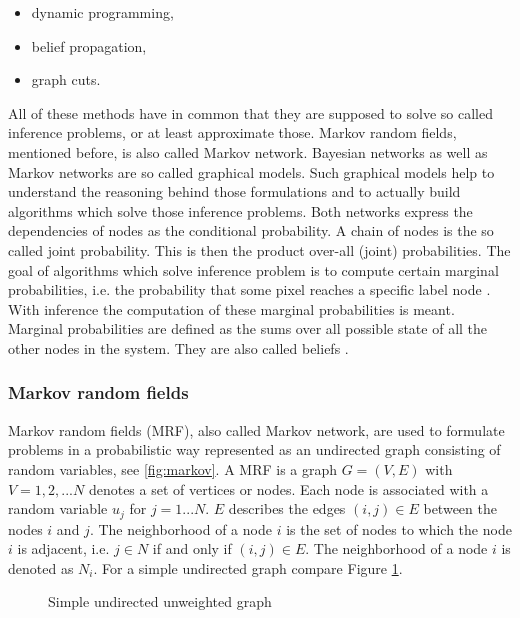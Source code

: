 \begin{itemize}
  \item dynamic programming,
  \item belief propagation,
  \item graph cuts.
\end{itemize}

\noindent All of these methods have in common that they are supposed to solve so called inference problems, or at least approximate those.
Markov random fields, mentioned before, is also called Markov network.
Bayesian networks as well as Markov networks are so called graphical models.
Such graphical models help to understand the reasoning behind those formulations and to actually build algorithms which solve those inference problems.
Both networks express the dependencies of nodes as the conditional probability.
A chain of nodes is the so called joint probability.
This is then the product over-all (joint) probabilities.
The goal of algorithms which solve inference problem is to compute certain marginal probabilities, i.e. the probability that some pixel reaches a specific label node \citep{cyganek2011introduction}.
With inference the computation of these marginal probabilities is meant.
Marginal probabilities are defined as the sums over all possible state of all the other nodes in the system.
They are also called beliefs \citep{yedidia2003understanding}.

\subsubsection{Markov random fields}

Markov random fields (MRF), also called Markov network, are used to formulate problems in a probabilistic way represented as an undirected graph consisting of random variables, see \ref{fig:markov}.
A MRF is a graph $G = (V, E)$ with $V = {1,2,...N}$ denotes a set of vertices or nodes.
Each node is associated with a random variable $u_j$ for $j = 1...N$.
$E$ describes the edges $(i,j) \in E$ between the nodes $i$ and $j$.
The neighborhood of a node $i$ is the set of nodes to which the node $i$ is adjacent, i.e. $j \in N$ if and only if $(i,j) \in E$.
The neighborhood of a node $i$ is denoted as $N_i$.
For a simple undirected graph compare Figure \ref{fig:simple-graph}.

\begin{figure}[h!]
  \centering
  \caption[Simple undirected unweighted graph]{Simple undirected unweighted graph}
  \label{fig:simple-graph}
\end{figure}

